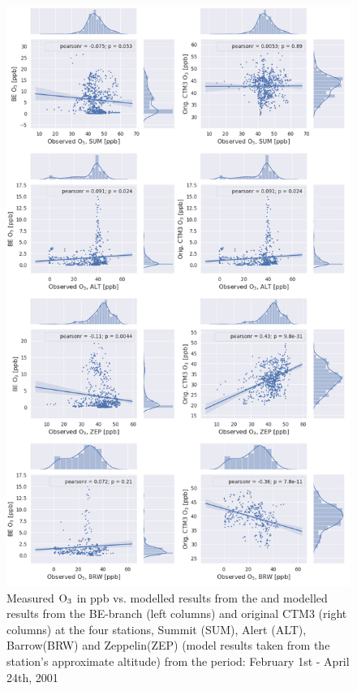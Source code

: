 \begin{figure}[ht]
    \centering
    \includegraphics[width = 0.8\linewidth]{Chapter6_Results/images/jointplot_FebApr_O3_2001.png}
    \caption{Measured $\mathrm{O_3}$ in ppb vs. modelled results from the and modelled results from the BE-branch (left columns) and original CTM3 (right columns) at the four stations, Summit (SUM), Alert (ALT), Barrow(BRW) and Zeppelin(ZEP) (model results taken from the station's approximate altitude) from the period: February 1st - April 24th, 2001}
    \label{fig:joint_FebApr}
\end{figure}